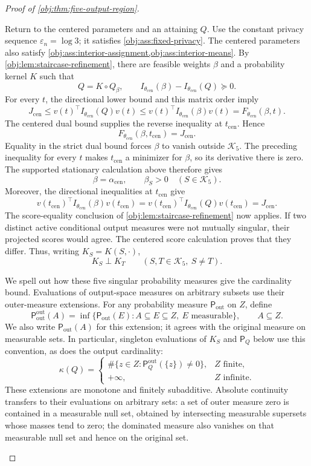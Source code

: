 \documentclass[11pt]{article}
\begin{document}
\begin{proof}[Proof of \cref{obj:thm:five-output-region}]
\begin{enumerate}
Return to the centered parameters and an attaining \(Q\). Use the
constant privacy sequence \(\varepsilon_n=\log3\); it satisfies
\cref{obj:ass:fixed-privacy}. The centered parameters also satisfy
\cref{obj:ass:interior-assignment,obj:ass:interior-means}.
By \cref{obj:lem:staircase-refinement}, there are feasible weights
\(\beta\) and a probability kernel \(K\) such that
\[
Q=K\circ Q_\beta,
\qquad
I_{\theta_{\mathrm{cen}}}(\beta)-I_{\theta_{\mathrm{cen}}}(Q)\succeq0.
\]
For every \(t\), the directional lower bound and this matrix order imply
\[
J_{\mathrm{cen}}
\le
v(t)^\top I_{\theta_{\mathrm{cen}}}(Q)v(t)
\le
v(t)^\top I_{\theta_{\mathrm{cen}}}(\beta)v(t)
=
F_{\theta_{\mathrm{cen}}}(\beta,t).
\]
The centered dual bound supplies the reverse inequality at
\(t_{\mathrm{cen}}\). Hence
\[
F_{\theta_{\mathrm{cen}}}(\beta,t_{\mathrm{cen}})
=J_{\mathrm{cen}}.
\]
Equality in the strict dual bound forces \(\beta\) to vanish outside
\(\mathcal K_5\). The preceding inequality for every \(t\) makes
\(t_{\mathrm{cen}}\) a minimizer for \(\beta\), so its derivative there is
zero. The supported stationary calculation above therefore gives
\[
\beta=\alpha_{\mathrm{cen}},
\qquad
\beta_S>0\quad(S\in\mathcal K_5).
\]
Moreover, the directional inequalities at \(t_{\mathrm{cen}}\) give
\[
v(t_{\mathrm{cen}})^\top I_{\theta_{\mathrm{cen}}}(\beta)
v(t_{\mathrm{cen}})
=
v(t_{\mathrm{cen}})^\top I_{\theta_{\mathrm{cen}}}(Q)
v(t_{\mathrm{cen}})
=
J_{\mathrm{cen}}.
\]
The score-equality conclusion of
\cref{obj:lem:staircase-refinement} now applies. If two distinct active
conditional output measures were not mutually singular, their projected
scores would agree. The centered score calculation proves that they
differ. Thus, writing \(K_S=K(S,\cdot)\),
\[
K_S\perp K_T
\qquad(S,T\in\mathcal K_5,\ S\ne T).
\]

We spell out how these five singular probability measures give the
cardinality bound. Evaluations of output-space measures on arbitrary
subsets use their outer-measure extensions. For any probability measure
\(\mathsf P_{\mathrm{out}}\) on \(Z\), define
\[
\mathsf P_{\mathrm{out}}^{\mathrm{out}}(A)
=
\inf\bigl\{\mathsf P_{\mathrm{out}}(E):
A\subseteq E\subseteq Z,\ E\text{ measurable}\bigr\},
\qquad A\subseteq Z.
\]
We also write \(\mathsf P_{\mathrm{out}}(A)\) for this extension; it agrees
with the original measure on measurable sets. In particular, singleton
evaluations of \(K_S\) and \(\mathsf P_Q\) below use this convention, as
does the output cardinality:
\[
\kappa(Q)=
\begin{cases}
\#\{z\in Z:\mathsf P_Q^{\mathrm{out}}(\{z\})\ne0\},&Z\text{ finite},\\
+\infty,&Z\text{ infinite}.
\end{cases}
\]
These extensions are monotone and finitely subadditive. Absolute
continuity transfers to their evaluations on arbitrary sets: a set of
outer measure zero is contained in a measurable null set, obtained by
intersecting measurable supersets whose masses tend to zero; the
dominated measure also vanishes on that measurable null set and hence
on the original set.


\end{enumerate}
\end{proof}
\end{document}
